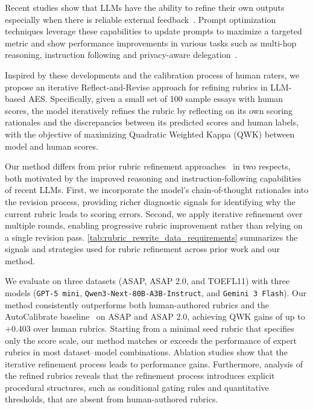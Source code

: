 \documentclass[11pt]{article}
\begin{document}
Recent studies show that LLMs have the ability to refine their own outputs especially when there is reliable external feedback~\citep{madaan2023selfrefine,kamoi2024selfcorrect}. Prompt optimization techniques leverage these capabilities to update prompts to maximize a targeted metric and show performance improvements in various tasks such as multi-hop reasoning, instruction following and privacy-aware delegation~\citep{khattab2023dspy,opsahl-ong-etal-2024-optimizing,agrawal2025gepa}.

Inspired by these developments and the calibration process of human raters, we propose an iterative Reflect-and-Revise approach for refining rubrics in LLM-based AES.
Specifically, given a small set of 100 sample essays with human scores, the model iteratively refines the rubric by reflecting on its own scoring rationales and the discrepancies between its predicted scores and human labels, with the objective of maximizing Quadratic Weighted Kappa (QWK) between model and human scores.

Our method differs from prior rubric refinement approaches~\citep{xie2024gradelikehuman,lee-etal-2024-unleashing,liu-etal-2024-calibrating} in two respects, both motivated by the improved reasoning and instruction-following capabilities of recent LLMs. First, we incorporate the model's chain-of-thought rationales into the revision process, providing richer diagnostic signals for identifying why the current rubric leads to scoring errors. Second, we apply iterative refinement over multiple rounds, enabling progressive rubric improvement rather than relying on a single revision pass. \autoref{tab:rubric_rewrite_data_requirements} summarizes the signals and strategies used for rubric refinement across prior work and our method.

We evaluate on three datasets (ASAP, ASAP 2.0, and TOEFL11) with three models (\texttt{GPT-5 mini}, \texttt{Qwen3-Next-80B-A3B-Instruct}, and \texttt{Gemini 3 Flash}). Our method consistently outperforms both human-authored rubrics and the AutoCalibrate baseline~\citep{liu-etal-2024-calibrating} on ASAP and ASAP 2.0, achieving QWK gains of up to +0.403 over human rubrics. Starting from a minimal seed rubric that specifies only the score scale, our method matches or exceeds the performance of expert rubrics in most dataset--model combinations. Ablation studies show that the iterative refinement process leads to performance gains.
Furthermore, analysis of the refined rubrics reveals that the refinement process introduces explicit procedural structures, such as conditional gating rules and quantitative thresholds, that are absent from human-authored rubrics.
\end{document}

